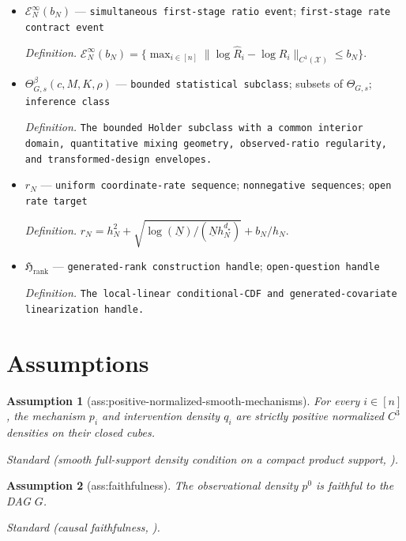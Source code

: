 \documentclass{article}
\newtheorem{assumption}{Assumption}
\begin{document}
\begin{itemize}
  \item \(\mathcal E_N^{\infty}(b_N)\) --- \texttt{simultaneous first-\allowbreak{}stage ratio event}; \texttt{first-\allowbreak{}stage rate contract event}
  \par\smallskip\noindent\emph{Definition.} \(\mathcal E_N^{\infty}(b_N)=\{\max_{i\in[n]}\|\log\widehat R_i-\log R_i\|_{C^1(\mathcal X)}\le b_N\}\).
  \item \(\Theta^{\beta}_{G,s}(c,M,K,\rho)\) --- \texttt{bounded statistical subclass}; subsets of \(\Theta_{G,s}\); \texttt{inference class}
  \par\smallskip\noindent\emph{Definition.} \texttt{The bounded Holder subclass with a common interior domain,\allowbreak{} quantitative mixing geometry,\allowbreak{} observed-\allowbreak{}ratio regularity,\allowbreak{} and transformed-\allowbreak{}design envelopes.}
  \item \(r_N\) --- \texttt{uniform coordinate-\allowbreak{}rate sequence}; \texttt{nonnegative sequences}; \texttt{open rate target}
  \par\smallskip\noindent\emph{Definition.} \(r_N=h_N^2+\sqrt{\log(\underline N)/(\underline N h_N^{d_\star})}+b_N/h_N\).
  \item \(\mathfrak H_{\mathrm{rank}}\) --- \texttt{generated-\allowbreak{}rank construction handle}; \texttt{open-\allowbreak{}question handle}
  \par\smallskip\noindent\emph{Definition.} \texttt{The local-\allowbreak{}linear conditional-\allowbreak{}CDF and generated-\allowbreak{}covariate linearization handle.}
\end{itemize}

\section{Assumptions}

\begin{assumption}[ass:positive-normalized-smooth-mechanisms]\label{ass:positive-normalized-smooth-mechanisms}
For every \(i\in[n]\), the mechanism \(p_i\) and intervention density \(q_i\) are strictly positive normalized \(C^3\) densities on their closed cubes.
\par\smallskip\noindent\emph{Standard} (smooth full-support density condition on a compact product support, \cite{vonKugelgenEtAl2023UnknownInterventions}).
\end{assumption}

\begin{assumption}[ass:faithfulness]\label{ass:faithfulness}
The observational density \(p^0\) is faithful to the DAG \(G\).
\par\smallskip\noindent\emph{Standard} (causal faithfulness, \cite{SpirtesGlymourScheines2000}).
\end{assumption}
\end{document}

